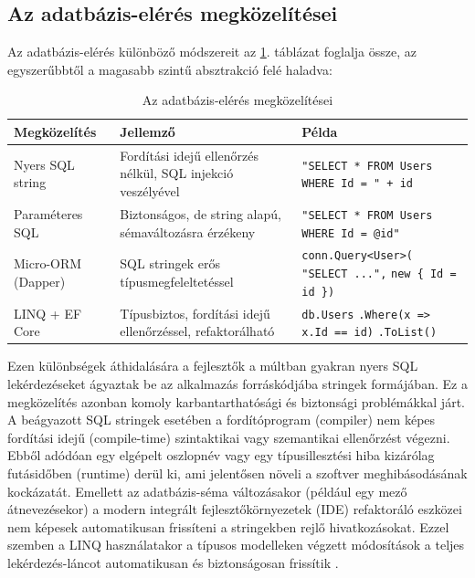 \documentclass[a4paper,12pt]{article}
\begin{document}
\subsection{Az adatbázis-elérés megközelítései}

Az adatbázis-elérés különböző módszereit az \ref{tab:adatbazis-eleres}. táblázat foglalja össze, az egyszerűbbtől a magasabb szintű absztrakció felé haladva:
 
\begin{table}[h]
\centering
\caption{Az adatbázis-elérés megközelítései}
\label{tab:adatbazis-eleres}
\renewcommand{\arraystretch}{1.4}
\small
\begin{tabular}{|p{}|p{}|p{}|}
\hline
\textbf{Megközelítés} & \textbf{Jellemző} & \textbf{Példa} \\
\hline
Nyers SQL string & Fordítási idejű ellenőrzés nélkül, SQL injekció veszélyével &
  \texttt{"SELECT * FROM Users} \newline \texttt{WHERE Id = " + id} \\
\hline
Paraméteres SQL & Biztonságos, de string alapú, sémaváltozásra érzékeny &
  \texttt{"SELECT * FROM Users} \newline \texttt{WHERE Id = @id"} \\
\hline
Micro-ORM (Dapper) & SQL stringek erős típusmegfeleltetéssel &
  \texttt{conn.Query<User>(} \newline \texttt{"SELECT ...",} \newline \texttt{new \{ Id = id \})} \\
\hline
LINQ + EF Core & Típusbiztos, fordítási idejű ellenőrzéssel, refaktorálható &
  \texttt{db.Users} \newline \texttt{.Where(x => x.Id == id)} \newline \texttt{.ToList()} \\
\hline
\end{tabular}
\end{table}

Ezen különbségek áthidalására a fejlesztők a múltban gyakran nyers SQL lekérdezéseket ágyaztak be az alkalmazás forráskódjába stringek formájában. Ez a megközelítés azonban komoly karbantarthatósági és biztonsági problémákkal járt. A beágyazott SQL stringek esetében a fordítóprogram (compiler) nem képes fordítási idejű (compile-time) szintaktikai vagy szemantikai ellenőrzést végezni. Ebből adódóan egy elgépelt oszlopnév vagy egy típusillesztési hiba kizárólag futásidőben (runtime) derül ki, ami jelentősen növeli a szoftver meghibásodásának kockázatát. Emellett az adatbázis-séma változásakor (például egy mező átnevezésekor) a modern integrált fejlesztőkörnyezetek (IDE) refaktoráló eszközei nem képesek automatikusan frissíteni a stringekben rejlő hivatkozásokat. Ezzel szemben a LINQ használatakor a típusos modelleken végzett módosítások a teljes lekérdezés-láncot automatikusan és biztonságosan frissítik \cite{skeet2019csharp}.
\end{document}
